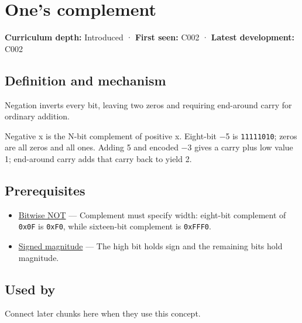 \hypertarget{appendix-03c678cd40b3}{}\label{referencestart:appendix-03c678cd40b3}
\section{One's complement}\label{appendix-03c678cd40b3-ones-complement}

\textbf{Curriculum depth:} Introduced · \textbf{First seen:} C002 · \textbf{Latest development:} C002

\begin{allmightroledefinition}

\subsection{Definition and mechanism}\label{appendix-03c678cd40b3-definition-and-mechanism}

Negation inverts every bit, leaving two zeros and requiring end-around carry for ordinary addition.

\end{allmightroledefinition}

Negative x is the N-bit complement of positive x. Eight-bit −5 is \texttt{11111010}; zeros are all zeros and all ones. Adding 5 and encoded −3 gives a carry plus low value 1; end-around carry adds that carry back to yield 2.

\subsection{Prerequisites}\label{appendix-03c678cd40b3-prerequisites}

\begin{itemize}
\tightlist
\item
  \hyperref[appendix-8f38927cfc54]{Bitwise NOT} --- Complement must specify width: eight-bit complement of \texttt{0x0F} is \texttt{0xF0}, while sixteen-bit complement is \texttt{0xFFF0}.
\item
  \hyperref[appendix-ce20506c8532]{Signed magnitude} --- The high bit holds sign and the remaining bits hold magnitude.
\end{itemize}

\subsection{Used by}\label{appendix-03c678cd40b3-used-by}

Connect later chunks here when they use this concept.

